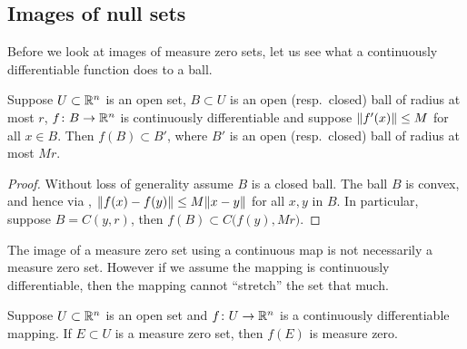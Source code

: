 \subsection{Images of null sets}

Before we look at images of measure zero sets, let us see what a
continuously differentiable function does to a ball.

\begin{lemma} \label{lemma:ballmapder}
Suppose $U \subset {\mathbb{R}}^n$ is an open set,
$B \subset U$ is an open (resp.\ closed) ball of radius at most $r$, $f \colon B \to {\mathbb{R}}^n$ is continuously
differentiable and suppose $\lVert {f'(x)} \rVert \leq M$ for all $x \in B$.
Then $f(B) \subset B'$, where $B'$ is an open (resp.\ closed) ball of radius at most $Mr$.
\end{lemma}

\begin{proof}
Without loss of generality assume $B$ is a closed ball.
The ball $B$ is convex, and hence via
,
$\lVert {f(x)-f(y)} \rVert \leq M \lVert {x-y} \rVert$
for all $x,y$ in $B$.  In particular, suppose $B = C(y,r)$,
then $f(B) \subset C\bigl(f(y),M r \bigr)$.
\end{proof}

The image of a measure zero set using a continuous map is not necessarily
a measure zero set.  However if we assume the mapping is continuously
differentiable, then the mapping cannot ``stretch'' the set that much.

\begin{prop} \label{prop:imagenull}
Suppose $U \subset {\mathbb{R}}^n$ is an open set and $f \colon U \to {\mathbb{R}}^n$
is a continuously differentiable mapping.  If $E \subset U$ is a 
measure zero set, then $f(E)$ is measure zero.
\end{prop}

